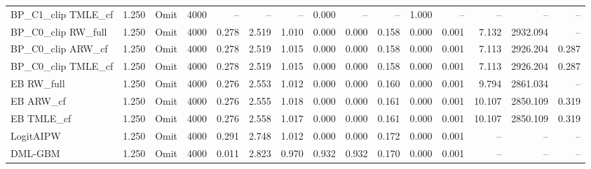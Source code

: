 \begin{tabular}{llllrrrrrrrrrrr}
BP\_C1\_clip TMLE\_cf & 1.250 & Omit & 4000 & -- & -- & -- & 0.000 & -- & -- & 1.000 & -- & -- & -- & -- \\
BP\_C0\_clip RW\_full & 1.250 & Omit & 4000 & 0.278 & 2.519 & 1.010 & 0.000 & 0.000 & 0.158 & 0.000 & 0.001 & 7.132 & 2932.094 & -- \\
BP\_C0\_clip ARW\_cf & 1.250 & Omit & 4000 & 0.278 & 2.519 & 1.015 & 0.000 & 0.000 & 0.158 & 0.000 & 0.001 & 7.113 & 2926.204 & 0.287 \\
BP\_C0\_clip TMLE\_cf & 1.250 & Omit & 4000 & 0.278 & 2.519 & 1.015 & 0.000 & 0.000 & 0.158 & 0.000 & 0.001 & 7.113 & 2926.204 & 0.287 \\
EB RW\_full & 1.250 & Omit & 4000 & 0.276 & 2.553 & 1.012 & 0.000 & 0.000 & 0.160 & 0.000 & 0.001 & 9.794 & 2861.034 & -- \\
EB ARW\_cf & 1.250 & Omit & 4000 & 0.276 & 2.555 & 1.018 & 0.000 & 0.000 & 0.161 & 0.000 & 0.001 & 10.107 & 2850.109 & 0.319 \\
EB TMLE\_cf & 1.250 & Omit & 4000 & 0.276 & 2.558 & 1.017 & 0.000 & 0.000 & 0.161 & 0.000 & 0.001 & 10.107 & 2850.109 & 0.319 \\
LogitAIPW & 1.250 & Omit & 4000 & 0.291 & 2.748 & 1.012 & 0.000 & 0.000 & 0.172 & 0.000 & 0.001 & -- & -- & -- \\
DML-GBM & 1.250 & Omit & 4000 & 0.011 & 2.823 & 0.970 & 0.932 & 0.932 & 0.170 & 0.000 & 0.001 & -- & -- & -- \\
\hline
\end{tabular}
